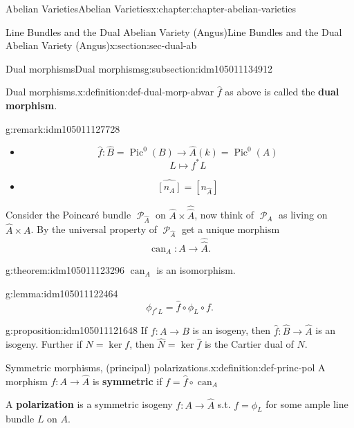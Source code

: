 \documentclass[oneside,10pt,]{book}
\newcommand{\terminology}[1]{\textbf{#1}}
\numberwithin{equation}{section}
\newcommand{\sheaf}[1]{\operatorname{\mathcal{#1}}}
\newcommand{\lb}{[}
\newcommand{\rb}{]}
\DeclareMathOperator{\Pic}{Pic}
\begin{document}
\begin{chapterptx}{Abelian Varieties}{}{Abelian Varieties}{}{}{x:chapter:chapter-abelian-varieties}
\begin{sectionptx}{Line Bundles and the Dual Abelian Variety (Angus)}{}{Line Bundles and the Dual Abelian Variety (Angus)}{}{}{x:section:sec-dual-ab}
\begin{subsectionptx}{Dual morphisms}{}{Dual morphisms}{}{}{g:subsection:idm105011134912}
%
\begin{definition}{Dual morphisms.}{x:definition:def-dual-morp-abvar}%
\(\hat f\) as above is called the \terminology{dual morphism}.%
\end{definition}
\begin{remark}{}{g:remark:idm105011127728}%
%
\begin{itemize}[label=\textbullet]
\item{}%
\begin{equation*}
\hat f\colon \hat B = \Pic^0(B) \to \hat A(k) = \Pic^0(A)
\end{equation*}
%
\begin{equation*}
L\mapsto f^*L
\end{equation*}
%
\item{}%
\begin{equation*}
\hat{\lb n_A\rb} = [n_{\hat A}]
\end{equation*}
%
\end{itemize}
%
\end{remark}
Consider the Poincaré bundle \(\sheaf P_{\hat A}\) on \(\hat A \times \hat{\hat{A}}\), now think of \(\sheaf P_A\) as living on \(\hat A \times A\). By the universal property of \(\sheaf P_{\hat A}\) get a unique morphism%
\begin{equation*}
\operatorname{can}_A\colon A\to\hat{\hat A}\text{.}
\end{equation*}
%
\begin{theorem}{}{}{g:theorem:idm105011123296}%
\(\operatorname{can}_A\) is an isomorphism.%
\end{theorem}
\begin{lemma}{}{}{g:lemma:idm105011122464}%
%
\begin{equation*}
\phi_{f^*L} = \hat f\circ \phi_L\circ f\text{.}
\end{equation*}
%
\end{lemma}
\begin{proposition}{}{}{g:proposition:idm105011121648}%
If \(f\colon A \to B\) is an isogeny, then \(\hat f\colon \hat B \to \hat A\) is an isogeny. Further if \(N  = \ker f\), then \(\hat N = \ker \hat f\) is the Cartier  dual of \(N\).%
\end{proposition}
\begin{definition}{Symmetric morphisms, (principal) polarizations.}{x:definition:def-princ-pol}%
A morphism \(f\colon A \to \hat A\) is \terminology{symmetric} if \(f = \hat f\circ \operatorname{can}_A\)%
\par
A \terminology{polarization} is a symmetric isogeny \(f\colon A \to \hat A\) s.t. \(f=  \phi_L\) for some ample line bundle \(L\) on \(A\).%

\end{definition}
\end{subsectionptx}
\end{sectionptx}
\end{chapterptx}
\end{document}
